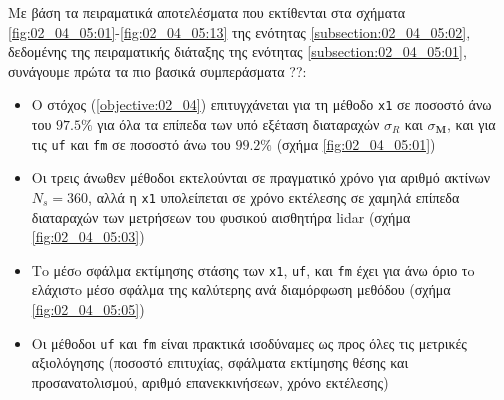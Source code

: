 Με βάση τα πειραματικά αποτελέσματα που εκτίθενται στα σχήματα
\ref{fig:02_04_05:01}-\ref{fig:02_04_05:13} της ενότητας
\ref{subsection:02_04_05:02}, δεδομένης της πειραματικής διάταξης της ενότητας
\ref{subsection:02_04_05:01}, συνάγουμε πρώτα τα πιο βασικά συμπεράσματα ??:

\begin{framed}
\begin{itemize}
  \item Ο στόχος (\ref{objective:02_04}) επιτυγχάνεται για τη μέθοδο
        \texttt{x1} σε ποσοστό άνω του $97.5\%$ για όλα τα επίπεδα των υπό
        εξέταση διαταραχών $\sigma_R$ και $\sigma_{\bm{M}}$, και για τις
        \texttt{uf} και \texttt{fm} σε ποσοστό άνω του $99.2\%$ (σχήμα
        \ref{fig:02_04_05:01})
  \item Οι τρεις άνωθεν μέθοδοι εκτελούνται σε πραγματικό χρόνο για αριθμό
        ακτίνων $N_s = 360$, αλλά η \texttt{x1} υπολείπεται σε χρόνο εκτέλεσης
        σε χαμηλά επίπεδα διαταραχών των μετρήσεων του φυσικού αισθητήρα lidar
        (σχήμα \ref{fig:02_04_05:03})
  \item Τo μέσo σφάλμα εκτίμησης στάσης των \texttt{x1}, \texttt{uf}, και
        \texttt{fm} έχει για άνω όριο τo ελάχιστo μέσο σφάλμα της καλύτερης
        ανά διαμόρφωση μεθόδου (σχήμα \ref{fig:02_04_05:05})
  \item Οι μέθοδοι \texttt{uf} και \texttt{fm} είναι πρακτικά ισοδύναμες ως προς
        όλες τις μετρικές αξιολόγησης (ποσοστό επιτυχίας, σφάλματα εκτίμησης
        θέσης και προσανατολισμού, αριθμό επανεκκινήσεων, χρόνο εκτέλεσης)
\end{itemize}
\end{framed}

